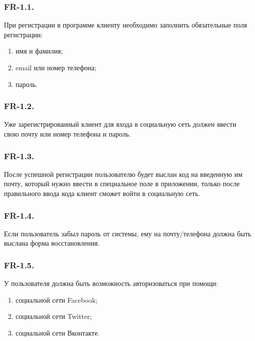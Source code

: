		\subsubsection*{FR-1.1.} При регистрации в программе  клиенту необходимо заполнить обязательные поля регистрации:
		
		\begin{enumerate}
			\item
				имя и фамилия;
			\item
				email или номер телефона;
			\item
				пароль.	
				
		\end{enumerate}
	
		\subsubsection*{FR-1.2.} 
		\hspace{10mm} Уже зарегистрированный клиент для входа в социальную сеть должен ввести
		свою почту или номер телефона и пароль.
	
		\subsubsection*{FR-1.3.}
		\hspace{10mm}После успешной регистрации пользователю будет выслан код
		на введенную им почту, который нужно ввести в специальное поле в приложении, только после правильного ввода кода клиент сможет войти в социальную
		сеть.

		\subsubsection*{FR-1.4.}
		\hspace{10mm} Если пользователь забыл пароль от системы, ему на почту/телефона должна быть выслана форма восстановления.
		
		\subsubsection*{FR-1.5.}
		\hspace{10mm} У пользователя должна быть возможность авторизоваться при помощи:
		\begin{enumerate}
			\item социальной сети Facebook;
			\item социальной сети Twitter;
			\item социальной сети Вконтакте.
		\end{enumerate}
		
